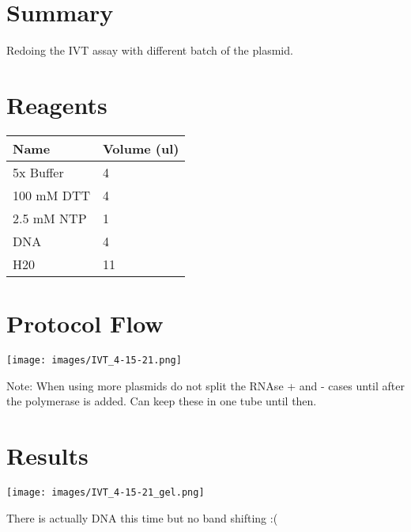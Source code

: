 \documentclass[
]{book}
\begin{document}
\hypertarget{summary}{%
\section{Summary}\label{summary}}

Redoing the IVT assay with different batch of the plasmid.

\hypertarget{reagents-1}{%
\section{Reagents}\label{reagents-1}}

\begin{longtable}[]{@{}ll@{}}
\toprule
Name & Volume (ul) \\
\midrule
\endhead
5x Buffer & 4 \\
100 mM DTT & 4 \\
2.5 mM NTP & 1 \\
DNA & 4 \\
H20 & 11 \\
\bottomrule
\end{longtable}

\hypertarget{protocol-flow}{%
\section{Protocol Flow}\label{protocol-flow}}

\texttt{[image: images/IVT\_4-15-21.png]}

Note: When using more plasmids do not split the RNAse + and - cases
until after the polymerase is added. Can keep these in one tube until
then.

\hypertarget{results-1}{%
\section{Results}\label{results-1}}

\texttt{[image: images/IVT\_4-15-21\_gel.png]}

There is actually DNA this time but no band shifting :(

\backmatter
\end{document}
